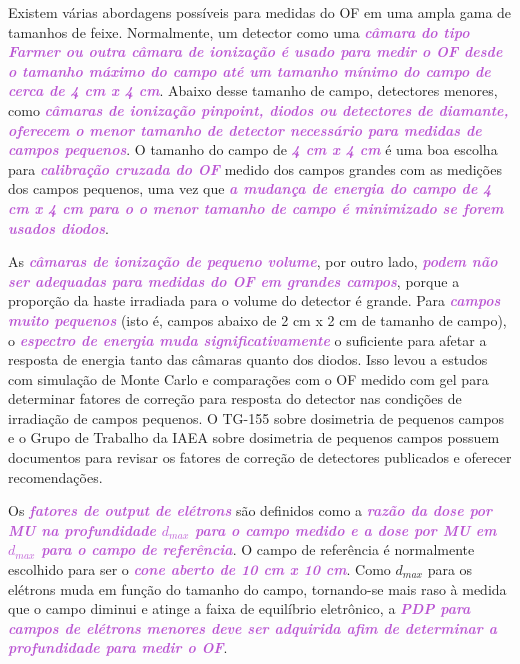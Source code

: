 \documentclass[11pt,a4paper]{article}
\begin{document}
	Existem várias abordagens possíveis para medidas do OF em uma ampla gama de tamanhos de feixe. Normalmente, um detector como uma \textcolor{MediumOrchid}{\textbf{\textit{câmara do tipo Farmer ou outra câmara de ionização é usado para medir o OF desde o tamanho máximo do campo até um tamanho mínimo do campo de cerca de 4 cm x 4 cm}}}. Abaixo desse tamanho de campo, detectores menores, como \textcolor{MediumOrchid}{\textbf{\textit{câmaras de ionização pinpoint, diodos ou detectores de diamante, oferecem o menor tamanho de detector necessário para medidas de campos pequenos}}}. O tamanho do campo de \textcolor{MediumOrchid}{\textbf{\textit{4 cm x 4 cm}}} é uma boa escolha para \textcolor{MediumOrchid}{\textbf{\textit{calibração cruzada do OF}}} medido dos campos grandes com as medições dos campos pequenos, uma vez que \textcolor{MediumOrchid}{\textbf{\textit{a mudança de energia do campo de 4 cm x 4 cm para o o menor tamanho de campo é minimizado se forem usados diodos}}}. 
	
	As \textcolor{MediumOrchid}{\textbf{\textit{câmaras de ionização de pequeno volume}}}, por outro lado, \textcolor{MediumOrchid}{\textbf{\textit{podem não ser adequadas para medidas do OF em grandes campos}}}, porque a proporção da haste irradiada para o volume do detector é grande. Para \textcolor{MediumOrchid}{\textbf{\textit{campos muito pequenos}}} (isto é, campos abaixo de 2 cm x 2 cm de tamanho de campo), o \textcolor{MediumOrchid}{\textbf{\textit{espectro de energia muda significativamente}}} o suficiente para afetar a resposta de energia tanto das câmaras quanto dos diodos. Isso levou a estudos com simulação de Monte Carlo e comparações com o OF medido com gel para determinar fatores de correção para resposta do detector nas condições de irradiação de campos pequenos. O TG-155 sobre dosimetria de pequenos campos e o Grupo de Trabalho da IAEA sobre dosimetria de pequenos campos possuem documentos para revisar os fatores de correção de detectores publicados e oferecer recomendações.

	Os \textcolor{MediumOrchid}{\textbf{\textit{fatores de output de elétrons}}} são definidos como a \textcolor{MediumOrchid}{\textbf{\textit{razão da dose por MU na profundidade $d_{max}$ para o campo medido e a dose por MU em $d_{max}$ para o campo de referência}}}. O campo de referência é normalmente escolhido para ser o \textcolor{MediumOrchid}{\textbf{\textit{cone aberto de 10 cm x 10 cm}}}. Como $d_{max}$ para os elétrons muda em função do tamanho do campo, tornando-se mais raso à medida que o campo diminui e atinge a faixa de equilíbrio eletrônico, a \textcolor{MediumOrchid}{\textbf{\textit{PDP para campos de elétrons menores deve ser adquirida afim de determinar a profundidade para medir o OF}}}.
\end{document}
